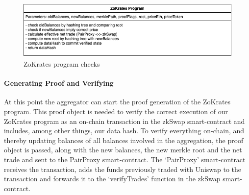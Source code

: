 \documentclass[../../thesis.tex]{subfiles}
\begin{document}


\begin{figure}[h]
    \centerline{\includegraphics[totalheight=3cm]{diagrams/zokrates.png}}
    \caption{ZoKrates program checks}
    \label{fig:zokrates}
\end{figure}

\paragraph{Generating Proof and Verifying}
At this point the aggregator can start the proof generation of the ZoKrates program. This proof object is needed to verify the correct execution of our ZoKrates program as an on-chain transaction in the zkSwap smart-contract and includes, among other things, our data hash. To verify everything on-chain, and thereby updating balances of all balances involved in the aggregation, the proof object is passed, along with the new balances, the new merkle root and the net trade and sent to the PairProxy smart-contract. The `PairProxy' smart-contract receives the transaction, adds the funds previously traded with Uniswap to the transaction and forwards it to the `verifyTrades' function in the zkSwap smart-contract. 
\end{document}
